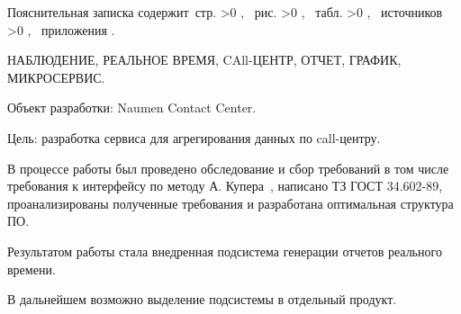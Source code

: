 \Referat

Пояснительная записка содержит \pageref{LastPage}\,стр.%
\ifnum \totfig >0
, \totfig~рис.%
\fi
\ifnum \tottab >0
, \tottab~табл.%
\fi
%
\ifnum \totbib >0
, \totbib~источников%
\fi
%
\ifnum \totapp >0
, \totapp~приложения%
\else
.%
\fi

НАБЛЮДЕНИЕ, РЕАЛЬНОЕ ВРЕМЯ, CAll-ЦЕНТР, ОТЧЕТ, ГРАФИК, МИКРОСЕРВИС.

Объект разработки: Naumen Contact Center.

Цель: разработка сервиса для агрегирования данных по call-центру.

В процессе работы был проведено обследование и сбор требований в том числе требования к интерфейсу по методу А. Купера~\cite{cooper2014face},
написано ТЗ ГОСТ 34.602-89, проанализированы полученные требования и разработана оптимальная структура ПО.

Результатом работы стала внедренная подсистема генерации отчетов реального времени.

В дальнейшем возможно выделение подсистемы в отдельный продукт.